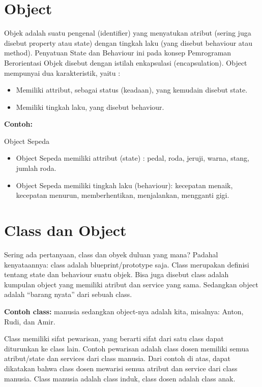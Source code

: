 \section{Object}\label{object}

Objek adalah suatu pengenal (identifier) yang menyatukan atribut (sering
juga disebut property atau state) dengan tingkah laku (yang disebut
behaviour atau method). Penyatuan State dan Behaviour ini pada konsep
Pemrograman Berorientasi Objek disebut dengan istilah enkapsulasi
(encapsulation). Object mempunyai dua karakteristik, yaitu :

\begin{itemize}

\item
  Memiliki attribut, sebagai status (keadaan), yang kemudain disebut
  state.
\item
  Memiliki tingkah laku, yang disebut behaviour.
\end{itemize}

\textbf{Contoh:}

Object Sepeda

\begin{itemize}

\item
  Object Sepeda memiliki attribut (state) : pedal, roda, jeruji, warna,
  stang, jumlah roda.
\item
  Object Sepeda memiliki tingkah laku (behaviour): kecepatan menaik,
  kecepatan menurun, memberhentikan, menjalankan, mengganti gigi.
\end{itemize}

\section{Class dan Object}\label{class-dan-object-1}

Sering ada pertanyaan, class dan obyek duluan yang mana? Padahal
kenyataannya: class adalah blueprint/prototype saja. Class merupakan
definisi tentang state dan behaviour suatu objek. Bisa juga disebut
class adalah kumpulan object yang memiliki atribut dan service yang
sama. Sedangkan object adalah ``barang nyata'' dari sebuah class.

\textbf{Contoh class:} manusia sedangkan object-nya adalah kita, misalnya: Anton,
Rudi, dan Amir.

Class memiliki sifat pewarisan, yang berarti sifat dari satu class dapat
diturunkan ke class lain. Contoh pewarisan adalah class dosen memiliki
semua atribut/state dan services dari class manusia. Dari contoh di
atas, dapat dikatakan bahwa class dosen mewarisi semua atribut dan
service dari class manusia. Class manusia adalah class induk, class
dosen adalah class anak.

